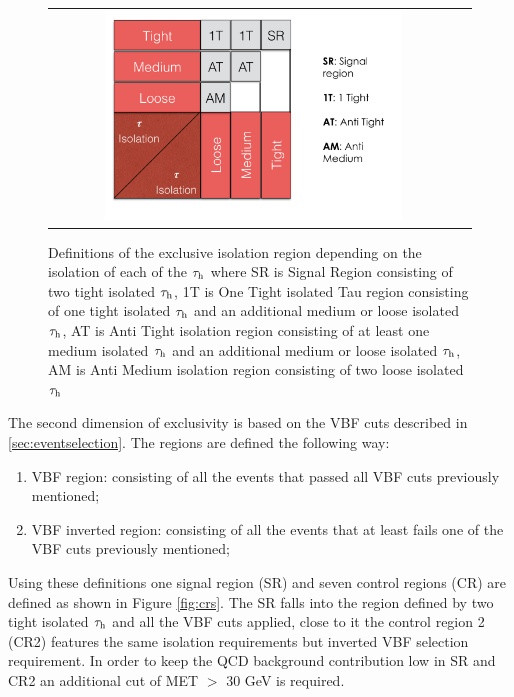  	\begin{figure}[tbh!]
 		\centering
 		\begin{tabular}{cc}
 			\includegraphics[width=0.75\textwidth]{PLOTS/diTauHadLSotherPlots/tauisoregions.png}
 		\end{tabular}
 		\caption{Definitions of the exclusive isolation region depending on the isolation of each of the $\tau_{\text{h}}$ where SR is Signal Region consisting of two tight isolated $\tau_{\text{h}}$, 1T is One Tight isolated Tau region consisting of one tight isolated $\tau_{\text{h}}$ and an additional medium or loose isolated $\tau_{\text{h}}$, AT is Anti Tight isolation region consisting of at least one medium isolated $\tau_{\text{h}}$ and an additional medium or loose isolated $\tau_{\text{h}}$,  AM is Anti Medium isolation region consisting of two loose isolated $\tau_{\text{h}}$}
 		\label{fig:tauisoregions}
 	\end{figure}
 
The second dimension of exclusivity is based on the VBF cuts described in \ref{sec:eventselection}. The regions are defined the following way:
	
	\begin{enumerate}
		\item VBF region: consisting of all the events that passed all VBF cuts previously mentioned;
		\item VBF inverted region: consisting of all the events that at least fails one of the VBF cuts previously mentioned;
	\end{enumerate} 

Using these definitions one signal region (SR) and seven control regions (CR) are defined as shown in Figure \ref{fig:crs}. The SR falls into the region defined by two tight isolated $\tau_{\text{h}}$ and all the VBF cuts applied, close to it the control region 2 (CR2) features the same \hadtau isolation requirements but inverted VBF selection requirement. In order to keep the QCD background contribution low in SR and CR2 an additional cut of  MET $ > $ 30 GeV is required.

